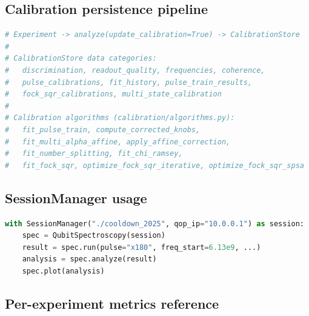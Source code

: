 \documentclass[11pt]{article}
\begin{document}
\subsection{Calibration persistence pipeline}
\begin{lstlisting}[language=Python]
# Experiment -> analyze(update_calibration=True) -> CalibrationStore
#
# CalibrationStore data categories:
#   discrimination, readout_quality, frequencies, coherence,
#   pulse_calibrations, fit_history, pulse_train_results,
#   fock_sqr_calibrations, multi_state_calibration
#
# Calibration algorithms (calibration/algorithms.py):
#   fit_pulse_train, compute_corrected_knobs,
#   fit_multi_alpha_affine, apply_affine_correction,
#   fit_number_splitting, fit_chi_ramsey,
#   fit_fock_sqr, optimize_fock_sqr_iterative, optimize_fock_sqr_spsa
\end{lstlisting}

\subsection{SessionManager usage}
\begin{lstlisting}[language=Python]
with SessionManager("./cooldown_2025", qop_ip="10.0.0.1") as session:
    spec = QubitSpectroscopy(session)
    result = spec.run(pulse="x180", freq_start=6.13e9, ...)
    analysis = spec.analyze(result)
    spec.plot(analysis)
\end{lstlisting}

\subsection{Per-experiment metrics reference}
\end{document}
